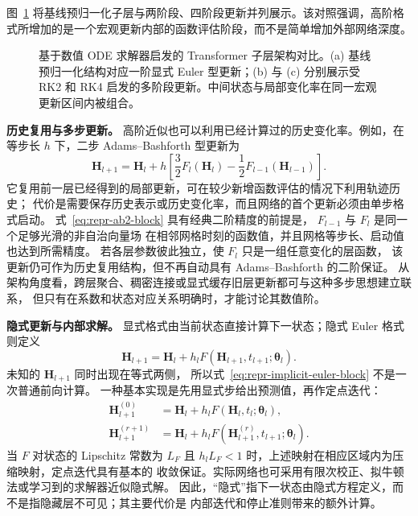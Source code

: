 \documentclass[UTF8,a4paper,zihao=-4,oneside,openany]{ctexbook}
\makeatletter
\newcommand{\AMLFigure}[2][0.96\linewidth]{%
  \begingroup
  \let\AtBeginDocument\@gobble
  \endgroup
}
\makeatother
\begin{document}
图~\ref{fig:transformer-rk-blocks} 将基线预归一化子层与两阶段、四阶段更新并列展示。该对照强调，高阶格式所增加的是一个宏观更新内部的函数评估阶段，而不是简单增加外部网络深度。

\begin{figure}[!t]
\centering
\AMLFigure{figure-transformer-rk-blocks}
\caption{基于数值 ODE 求解器启发的 Transformer 子层架构对比。(a) 基线预归一化结构对应一阶显式 Euler 型更新；(b) 与 (c) 分别展示受 RK2 和 RK4 启发的多阶段更新。中间状态与局部变化率在同一宏观更新区间内被组合。}
\label{fig:transformer-rk-blocks}
\end{figure}

\textbf{历史复用与多步更新。}
高阶近似也可以利用已经计算过的历史变化率。例如，在等步长 \(h\) 下，二步
Adams--Bashforth 型更新为
\begin{equation}
    \boldsymbol{H}_{l+1}
    =
    \boldsymbol{H}_{l}
    +
    h
    \left[
        \frac{3}{2}
        F_l(\boldsymbol{H}_{l})
        -
        \frac{1}{2}
        F_{l-1}(\boldsymbol{H}_{l-1})
    \right].
    \label{eq:repr-ab2-block}
\end{equation}
它复用前一层已经得到的局部更新，可在较少新增函数评估的情况下利用轨迹历史；
代价是需要保存历史表示或历史变化率，而且网络的首个更新必须由单步格式启动。
式~\eqref{eq:repr-ab2-block} 具有经典二阶精度的前提是，
\(F_{l-1}\) 与 \(F_l\) 是同一个足够光滑的非自治向量场
在相邻网格时刻的函数值，并且网格等步长、启动值也达到所需精度。
若各层参数彼此独立，使 \(F_l\) 只是一组任意变化的层函数，
该更新仍可作为历史复用结构，但不再自动具有 Adams--Bashforth 的二阶保证。
从架构角度看，跨层聚合、稠密连接或显式缓存旧层更新都可与这种多步思想建立联系，
但只有在系数和状态对应关系明确时，才能讨论其数值阶。

\textbf{隐式更新与内部求解。}
显式格式由当前状态直接计算下一状态；隐式 Euler 格式则定义
\begin{equation}
    \boldsymbol{H}_{l+1}
    =
    \boldsymbol{H}_{l}
    +
    h_l
    F\!\left(
        \boldsymbol{H}_{l+1},t_{l+1};
        \boldsymbol{\theta}_{l}
    \right).
    \label{eq:repr-implicit-euler-block}
\end{equation}
未知的 \(\boldsymbol{H}_{l+1}\) 同时出现在等式两侧，
所以式~\eqref{eq:repr-implicit-euler-block} 不是一次普通前向计算。
一种基本实现是先用显式步给出预测值，再作定点迭代：
\begin{align}
    \boldsymbol{H}_{l+1}^{(0)}
    &=
    \boldsymbol{H}_{l}
    +
    h_l
    F(\boldsymbol{H}_{l},t_l;\boldsymbol{\theta}_{l}),
    \nonumber\\
    \boldsymbol{H}_{l+1}^{(r+1)}
    &=
    \boldsymbol{H}_{l}
    +
    h_l
    F\!\left(
        \boldsymbol{H}_{l+1}^{(r)},t_{l+1};
        \boldsymbol{\theta}_{l}
    \right).
    \label{eq:repr-fixed-point-block}
\end{align}
当 \(F\) 对状态的 Lipschitz 常数为 \(L_F\) 且
\(h_lL_F<1\) 时，上述映射在相应区域内为压缩映射，定点迭代具有基本的
收敛保证。实际网络也可采用有限次校正、拟牛顿法或学习到的求解器近似隐式解。
因此，“隐式”指下一状态由隐式方程定义，而不是指隐藏层不可见；其主要代价是
内部迭代和停止准则带来的额外计算。
\end{document}
